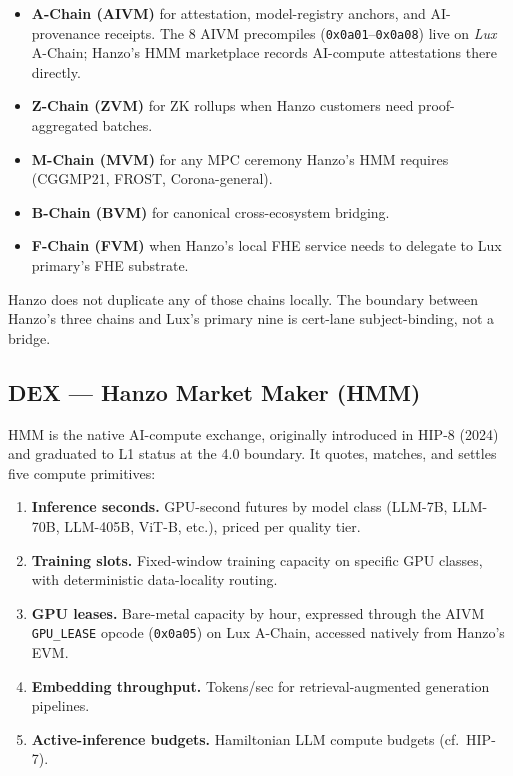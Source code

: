 \documentclass[11pt,letterpaper]{article}
\begin{document}
\begin{itemize}[leftmargin=*]
\item \textbf{A-Chain (AIVM)} for attestation, model-registry
      anchors, and AI-provenance receipts. The 8 AIVM precompiles
      (\texttt{0x0a01}--\texttt{0x0a08}) live on \emph{Lux} A-Chain;
      Hanzo's HMM marketplace records AI-compute attestations there
      directly.
\item \textbf{Z-Chain (ZVM)} for ZK rollups when Hanzo customers need
      proof-aggregated batches.
\item \textbf{M-Chain (MVM)} for any MPC ceremony Hanzo's HMM
      requires (CGGMP21, FROST, Corona-general).
\item \textbf{B-Chain (BVM)} for canonical cross-ecosystem bridging.
\item \textbf{F-Chain (FVM)} when Hanzo's local FHE service needs to
      delegate to Lux primary's FHE substrate.
\end{itemize}

Hanzo does not duplicate any of those chains locally. The boundary
between Hanzo's three chains and Lux's primary nine is cert-lane
subject-binding, not a bridge.

\subsection{DEX --- Hanzo Market Maker (HMM)}

HMM is the native AI-compute exchange, originally introduced in HIP-8
(2024) and graduated to L1 status at the 4.0 boundary. It quotes,
matches, and settles five compute primitives:

\begin{enumerate}[leftmargin=*]
\item \textbf{Inference seconds.} GPU-second futures by model class
(LLM-7B, LLM-70B, LLM-405B, ViT-B, etc.), priced per quality tier.
\item \textbf{Training slots.} Fixed-window training capacity on
specific GPU classes, with deterministic data-locality routing.
\item \textbf{GPU leases.} Bare-metal capacity by hour, expressed
through the AIVM \texttt{GPU\_LEASE} opcode (\texttt{0x0a05}) on
Lux A-Chain, accessed natively from Hanzo's EVM.
\item \textbf{Embedding throughput.} Tokens/sec for retrieval-augmented
generation pipelines.
\item \textbf{Active-inference budgets.} Hamiltonian LLM compute
budgets (cf.\ HIP-7).
\end{enumerate}
\end{document}
